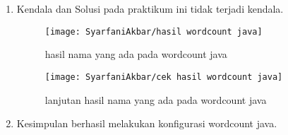 \newpage
{}
\begin{enumerate}
\item Kendala dan Solusi
pada praktikum ini tidak terjadi kendala.

\begin{figure}[!ht]
\texttt{[image: SyarfaniAkbar/hasil wordcount java]}
\caption{hasil nama yang ada pada wordcount java}
\label{gam:hasil wordcount java}
\end{figure}

\newpage
\begin{figure}[!ht]
\texttt{[image: SyarfaniAkbar/cek hasil wordcount java]}
\caption{lanjutan hasil nama yang ada pada wordcount java}
\label{gam:cek hasil wordcount java}
\end{figure}


\item Kesimpulan
berhasil melakukan konfigurasi wordcount java.
\end{enumerate}

